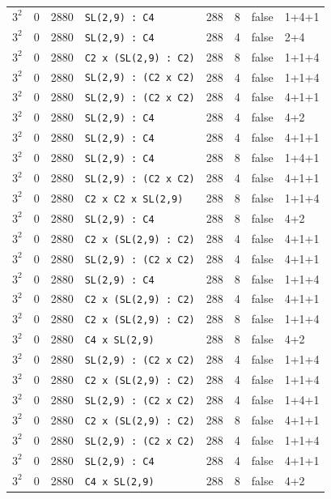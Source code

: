 \begin{longtable}{llrlrrll}
$3^2$ & 0 & 2880 & \texttt{SL(2,9) : C4} & 288 & 8 & false & 1+4+1\\
$3^2$ & 0 & 2880 & \texttt{SL(2,9) : C4} & 288 & 4 & false & 2+4\\
$3^2$ & 0 & 2880 & \texttt{C2 x (SL(2,9) : C2)} & 288 & 8 & false & 1+1+4\\
$3^2$ & 0 & 2880 & \texttt{SL(2,9) : (C2 x C2)} & 288 & 4 & false & 1+1+4\\
$3^2$ & 0 & 2880 & \texttt{SL(2,9) : (C2 x C2)} & 288 & 4 & false & 4+1+1\\
$3^2$ & 0 & 2880 & \texttt{SL(2,9) : C4} & 288 & 4 & false & 4+2\\
$3^2$ & 0 & 2880 & \texttt{SL(2,9) : C4} & 288 & 4 & false & 4+1+1\\
$3^2$ & 0 & 2880 & \texttt{SL(2,9) : C4} & 288 & 8 & false & 1+4+1\\
$3^2$ & 0 & 2880 & \texttt{SL(2,9) : (C2 x C2)} & 288 & 4 & false & 4+1+1\\
$3^2$ & 0 & 2880 & \texttt{C2 x C2 x SL(2,9)} & 288 & 8 & false & 1+1+4\\
$3^2$ & 0 & 2880 & \texttt{SL(2,9) : C4} & 288 & 8 & false & 4+2\\
$3^2$ & 0 & 2880 & \texttt{C2 x (SL(2,9) : C2)} & 288 & 4 & false & 4+1+1\\
$3^2$ & 0 & 2880 & \texttt{SL(2,9) : (C2 x C2)} & 288 & 4 & false & 4+1+1\\
$3^2$ & 0 & 2880 & \texttt{SL(2,9) : C4} & 288 & 8 & false & 1+1+4\\
$3^2$ & 0 & 2880 & \texttt{C2 x (SL(2,9) : C2)} & 288 & 4 & false & 4+1+1\\
$3^2$ & 0 & 2880 & \texttt{C2 x (SL(2,9) : C2)} & 288 & 8 & false & 1+1+4\\
$3^2$ & 0 & 2880 & \texttt{C4 x SL(2,9)} & 288 & 8 & false & 4+2\\
$3^2$ & 0 & 2880 & \texttt{SL(2,9) : (C2 x C2)} & 288 & 4 & false & 1+1+4\\
$3^2$ & 0 & 2880 & \texttt{C2 x (SL(2,9) : C2)} & 288 & 4 & false & 1+1+4\\
$3^2$ & 0 & 2880 & \texttt{SL(2,9) : (C2 x C2)} & 288 & 4 & false & 1+4+1\\
$3^2$ & 0 & 2880 & \texttt{C2 x (SL(2,9) : C2)} & 288 & 8 & false & 4+1+1\\
$3^2$ & 0 & 2880 & \texttt{SL(2,9) : (C2 x C2)} & 288 & 4 & false & 1+1+4\\
$3^2$ & 0 & 2880 & \texttt{SL(2,9) : C4} & 288 & 4 & false & 4+1+1\\
$3^2$ & 0 & 2880 & \texttt{C4 x SL(2,9)} & 288 & 8 & false & 4+2\\

\end{longtable}
